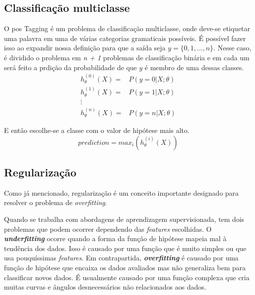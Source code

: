 \subsection{Classificação multiclasse}

O \ac{pos} Tagging é um problema de classificação multiclasse, onde deve-se etiquetar uma palavra em uma de várias categorias gramaticais possíveis. É possível fazer isso ao expandir nossa definição para que a saída seja $y = \{0, 1, ..., n\}$. Nesse caso, é dividido o problema em \textit{n + 1} problemas de classificação binária e em cada um será feito a prdição da probabilidade de que $y$ é membro de uma dessas classes.
\begin{align}
h_{\theta}^{(0)}(X) =&  P(y=0 | X ; \theta) \nonumber \\
h_{\theta}^{(1)}(X) =&  P(y=1 | X ; \theta) \nonumber \\
\vdots & \nonumber \\
h_{\theta}^{(n)}(X) =&  P(y=n | X ; \theta) \nonumber
\end{align}

E então escolhe-se a classe com o valor de hipótese mais alto.
\begin{equation}
prediction = max_i(h_{\theta}^{(i)}(X)) \nonumber
\end{equation}


\subsection{Regularização}\label{subsec:regularizacao}

Como já mencionado, regularização é um conceito importante designado para resolver o problema de \textit{overfitting}.

Quando se trabalha com abordagens de aprendizagem supervisionada, tem dois problemas que podem ocorrer dependendo das \textit{features} escolhidas. O \textbf{\textit{underfitting}} ocorre quando a forma da função de hipótese mapeia mal à tendência dos dados. Isso é causado por uma função que é muito simples ou que usa pouquíssimas \textit{features}. Em contrapartida, \textbf{\textit{overfitting}} é causado por uma função de hipótese que encaixa os dados avaliados mas não generaliza bem para classificar novos dados. É usualmente causado por uma função complexa que cria muitas curvas e ângulos desnecessários não relacionados aos dados.

